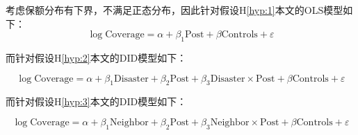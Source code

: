 考虑保额分布有下界，不满足正态分布，因此针对假设H\ref{hyp:1}本文的OLS模型如下：
\begin{equation}
    \log\text{Coverage}=\alpha+\beta_1\text{Post}+\beta\text{Controls}+\varepsilon
    \label{eq:OLS}
\end{equation}

而针对假设H\ref{hyp:2}本文的DID模型如下：

\begin{equation}
    \log\text{Coverage}=\alpha+\beta_1\text{Disaster}+\beta_2\text{Post}+\beta_3\text{Disaster}\times\text{Post}+\beta\text{Controls}+\varepsilon
    \label{eq:DID_1}
\end{equation}

而针对假设H\ref{hyp:3}本文的DID模型如下：

\begin{equation}
    \log\text{Coverage}=\alpha+\beta_1\text{Neighbor}+\beta_2\text{Post}+\beta_3\text{Neighbor}\times\text{Post}+\beta\text{Controls}+\varepsilon
    \label{eq:DID_2}
\end{equation}


